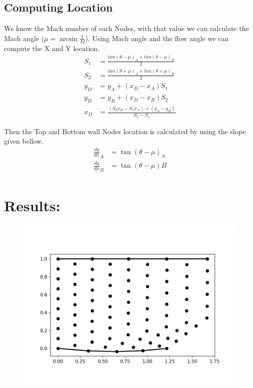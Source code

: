 \documentclass[conf]{new-aiaa}
\begin{document}
\subsection{Computing Location}
\par We know the Mach number of each Nodes, with that value we can calculate the Mach angle ($\mu = \arcsin\frac{1}{M}$). Using Mach angle and the flow angle we can compute the X and Y location. 
\begin{align*}
	S_1 &= \frac{tan(\theta-\mu)_A + tan(\theta-\mu)_B}{2} \\
	S_2 &= \frac{tan(\theta+\mu)_A + tan(\theta+\mu)_B}{2} \\
	y_D &=y_A + (x_D - x_A) S_1 \\
	y_D &=y_B + (x_D - x_B) S_2 \\
	x_D &= \frac{(S_2 x_B - S_1 x_A) + (y_A - y_B)}{S_2-S_1}
\end{align*}
\par Then the Top and Bottom wall Nodes location is calculated by using the slope given bellow.\\
\begin{align*}
	\frac{dy}{dx}_A & =\tan(\theta-\mu)_A \\
	\frac{dy}{dx}_B & =\tan(\theta-\mu)B \\
\end{align*}

\pagebreak
\section{Results:}
\begin{figure}[!h]
	\centering
	\includegraphics[scale=0.8]{results/Grid.png}
\end{figure}
\end{document}
